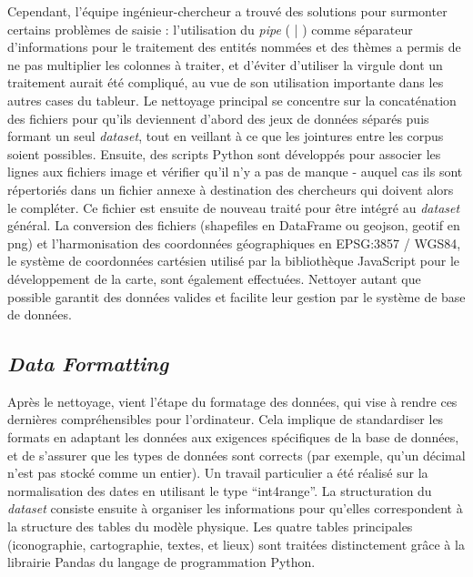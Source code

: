 Cependant, l'équipe ingénieur-chercheur a trouvé des solutions pour surmonter certains problèmes de saisie : l'utilisation du \textit{pipe} ( | ) comme séparateur d'informations pour le traitement des entités nommées et des thèmes a permis de ne pas multiplier les colonnes à traiter, et d'éviter d'utiliser la virgule dont un traitement aurait été compliqué, au vue de son utilisation importante dans les autres cases du tableur. Le nettoyage principal se concentre sur la concaténation des fichiers pour qu'ils deviennent d'abord des jeux de données séparés puis formant un seul \textit{dataset}, tout en veillant à ce que les jointures entre les corpus soient possibles. Ensuite, des scripts Python sont développés pour associer les lignes aux fichiers image et vérifier qu'il n'y a pas de manque - auquel cas ils sont répertoriés dans un fichier annexe à destination des chercheurs qui doivent alors le compléter. Ce fichier est ensuite de nouveau traité pour être intégré au \textit{dataset} général. La conversion des fichiers (shapefiles en DataFrame ou \acrshort{geojson}, \acrshort{geotif} en \acrshort{png}) et l'harmonisation des coordonnées géographiques en EPSG:3857 / WGS84, le système de coordonnées cartésien utilisé par la bibliothèque JavaScript pour le développement de la carte, sont également effectuées. Nettoyer autant que possible garantit des données valides et facilite leur gestion par le système de base de données.

\subsection{\textit{Data Formatting}}
Après le nettoyage, vient l'étape du formatage des données, qui vise à rendre ces dernières compréhensibles pour l'ordinateur. Cela implique de standardiser les formats en adaptant les données aux exigences spécifiques de la base de données, et de s'assurer que les types de données sont corrects (par exemple, qu'un décimal n'est pas stocké comme un entier). Un travail particulier a été réalisé sur la normalisation des dates en utilisant le type \enquote{int4range}. La structuration du \textit{dataset} consiste ensuite à organiser les informations pour qu'elles correspondent à la structure des tables du modèle physique. Les quatre tables principales (iconographie, cartographie, textes, et lieux) sont traitées distinctement grâce à la librairie Pandas du langage de programmation Python.

